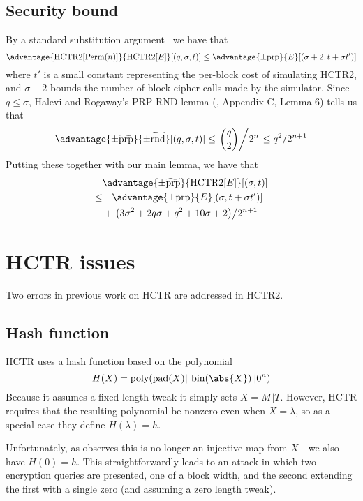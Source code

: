 \documentclass[letterpaper,11pt]{article}
\newcommand*{\Concat}{\Vert}
\DeclareMathOperator{\fromint}{bin}
\DeclareMathOperator{\HCTR}{HCTR2}
\DeclareMathOperator{\pad}{pad}
\DeclareMathOperator{\Perm}{Perm}
\DeclareMathOperator{\poly}{poly}
\begin{document}
\subsection{Security bound}
By a standard substitution argument~\cite{cbcsec,concrete} we have that
\begin{displaymath}
    \advantage{\HCTR[\Perm(n)]}{\HCTR[E]}[(q, \sigma, t)]
    \leq \advantage{\pm \mathrm{prp}}{E}[(\sigma + 2, t + \sigma t')]
\end{displaymath}
where \(t'\) is a small constant
representing the per-block cost of simulating HCTR2, and
\(\sigma + 2\) bounds the number of block cipher calls made by the simulator.
Since \(q \leq \sigma\), Halevi and Rogaway's PRP-RND lemma
(\cite{cmc}, Appendix C, Lemma 6) tells us that
\begin{displaymath}
    \advantage{\pm \widetilde{\mathrm{prp}}}{\pm\widetilde{\mathrm{rnd}}}[(q, \sigma, t)] 
    \leq \left.\binom{q}{2}\middle/2^n\right.
    \leq q^2/2^{n+1}
\end{displaymath}
Putting these together with our main lemma, we have that
\begin{align*}
    &\advantage{\pm \widetilde{\mathrm{prp}}}{\HCTR[E]}[(\sigma, t)] \\
    \leq & \quad \advantage{\pm \mathrm{prp}}{E}[(\sigma, t + \sigma t')] \\
    &+ \left.\left(3\sigma^2 + 2q\sigma + q^2 + 10\sigma + 2\right)\middle/2^{n+1}\right. \\
\end{align*}

\section{HCTR issues}\label{hctrissues}
Two errors in previous work on HCTR are addressed in HCTR2.
\subsection{Hash function}
HCTR uses a hash function based on the polynomial
\begin{displaymath}
    H(X) = \poly(\pad(X) \Concat \fromint(\abs{X}) \Concat 0^n)
\end{displaymath}
Because it assumes a fixed-length tweak it simply sets \(X = M \Concat T\).
However, HCTR requires that the resulting polynomial be nonzero
even when \(X = \lambda\), so as a special case they define
\(H(\lambda) = h\).

Unfortunately, as \cite{kumarhctr} observes this is no longer
an injective map from \(X\)---we also have \(H(0) = h\). This
straightforwardly leads to an attack in which two encryption queries
are presented, one of a block width, and the second extending
the first with a single zero (and assuming a zero length tweak).
\end{document}
